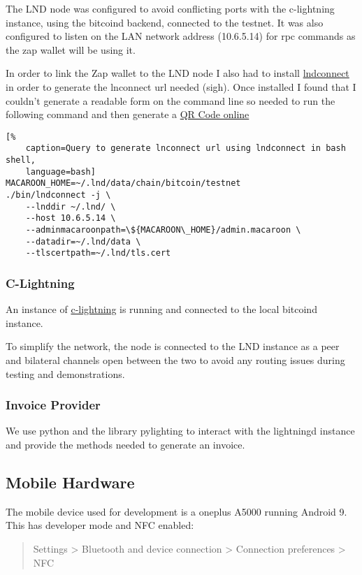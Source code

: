 \documentclass[a4paper]{article}
\begin{document}
The LND node was configured to avoid conflicting ports with the c-lightning instance,
using the bitcoind backend, connected to the testnet.  It was also configured to
listen on the LAN network address (10.6.5.14) for rpc commands as the zap wallet
will be using it.

In order to link the Zap wallet to the LND node I also had to install
\href{https://github.com/LN-Zap/lndconnect}{lndconnect} in order to generate the
lnconnect url needed (sigh).  Once installed I found that I couldn't generate a
readable form on the command line so needed to run the following command and then
generate a \href{https://www.online-qrcode-generator.com/}{QR Code online}

\begin{lstlisting}[%
	caption=Query to generate lnconnect url using lndconnect in bash shell,
	language=bash]
MACAROON_HOME=~/.lnd/data/chain/bitcoin/testnet
./bin/lndconnect -j \
	--lnddir ~/.lnd/ \
	--host 10.6.5.14 \
	--adminmacaroonpath=\${MACAROON\_HOME}/admin.macaroon \
	--datadir=~/.lnd/data \
	--tlscertpath=~/.lnd/tls.cert
\end{lstlisting}

\subsubsection{C-Lightning}
An instance of \href{https://github.com/ElementsProject/lightning}{c-lightning} is
running and connected to the local bitcoind instance.

To simplify the network, the node is connected to the LND instance as a peer and
bilateral channels open between the two to avoid any routing issues during testing
and demonstrations.

\subsubsection{Invoice Provider}
We use python and the library pylighting to interact with the lightningd instance and
provide the methods needed to generate an invoice.

\subsection{Mobile Hardware}
The mobile device used for development is a oneplus A5000 running Android 9.  This has
developer mode and NFC enabled:
\begin{quote}
Settings > Bluetooth and device connection > Connection preferences > NFC
\end{quote}
\end{document}
